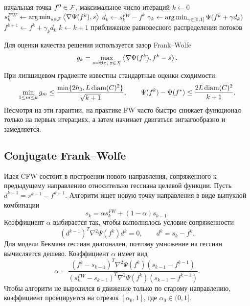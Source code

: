 \begin{algorithm}
\caption{Frank--Wolfe для модели Бекмана}
\begin{algorithmic}
\REQUIRE начальная точка $f^0\in\mathcal{F}$, максимальное число итераций
\STATE $k\gets 0$
\REPEAT
\STATE $s_k^{FW}\gets \operatorname*{arg\,min}_{s\in\mathcal{F}}\left\langle \nabla\Psi(f^k), s \right\rangle$
\STATE $d_k\gets s_k^{FW}-f^k$
\STATE $\gamma_k\gets\operatorname*{arg\,min}_{\gamma\in[0,1]}\Psi(f^k+\gamma d_k)$
\STATE $f^{k+1}\gets f^k+\gamma_k d_k$
\STATE $k\gets k+1$
\ENSURE приближение равновесного распределения потоков
\end{algorithmic}
\end{algorithm}

Для оценки качества решения используется зазор Frank--Wolfe
\[
    g_k=
    \max_{s=\Theta x,\;x\in X}
    \left\langle \nabla\Psi(f^k), f^k-s \right\rangle.
\]
При липшицевом градиенте известны стандартные оценки сходимости:
\[
    \min_{1\leq m\leq k} g_m
    \leq
    \frac{\min\{2h_0,L\operatorname{diam}(C)^2\}}{\sqrt{k+1}},
    \qquad
    \Psi(f^k)-\Psi(f^\ast)
    \leq
    \frac{2L\operatorname{diam}(C)^2}{k+1}.
\]
Несмотря на эти гарантии, на практике FW часто быстро снижает функционал только на первых итерациях, а затем начинает двигаться зигзагообразно и замедляется.

\subsection{Conjugate Frank--Wolfe}

Идея CFW состоит в построении нового направления, сопряженного к предыдущему направлению относительно гессиана целевой функции.
Пусть $d^{k-1}=s^{k-1}-f^{k-1}$.
Алгоритм ищет новую точку направления в виде выпуклой комбинации
\[
    s_k=\alpha s_k^{FW}+(1-\alpha)s_{k-1}.
\]
Коэффициент $\alpha$ выбирается так, чтобы выполнялось условие сопряженности
\[
    (d^{k-1})^T\nabla^2\Psi(f^k)d^k=0,
    \qquad
    d^k=s_k-f^k.
\]
Для модели Бекмана гессиан диагонален, поэтому умножение на гессиан вычисляется дешево.
Коэффициент $\alpha$ имеет вид
\begin{equation}
    \alpha =
    \frac{
        (f^k-s_{k-1})^T
        \nabla^2\Psi(f^k)
        (s_{k-1}-f^{k-1})
    }{
        (s_k^{FW}-s_{k-1})^T
        \nabla^2\Psi(f^k)
        (s_{k-1}-f^{k-1})
    }.
    \label{eq:cfw-alpha-traffic}
\end{equation}
Чтобы алгоритм не выродился в движение только по старому направлению, коэффициент проецируется на отрезок $[\alpha_0,1]$, где $\alpha_0\in(0,1]$.

